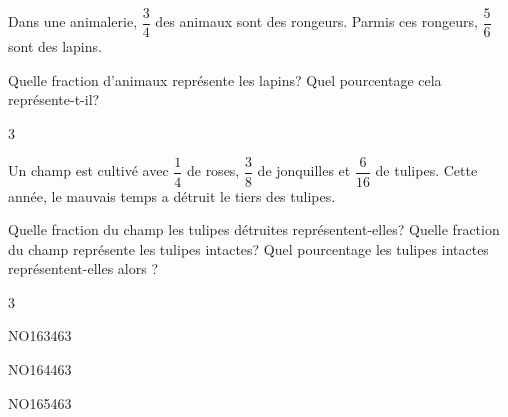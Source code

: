 \documentclass[a4paper,11pt]{report}
\begin{document}
\begin{exo}{Dans une animalerie, $\dfrac{3}{4}$ des animaux sont des rongeurs. Parmis ces rongeurs, $\dfrac{5}{6}$ sont des lapins.
\begin{tasks}
    \task Quelle fraction d'animaux représente les lapins?
    \task Quel pourcentage cela représente-t-il?
\end{tasks}
}{3}   
\end{exo}

\begin{exo}{Un champ est cultivé avec $\dfrac{1}{4}$ de roses, $\dfrac{3}{8}$ de jonquilles et $\dfrac{6}{16}$ de tulipes. Cette année, le mauvais temps a détruit le tiers des tulipes.
\begin{tasks}
    \task Quelle fraction du champ les tulipes détruites représentent-elles?
    \task Quelle fraction du champ représente les tulipes intactes? 
    \task Quel pourcentage les tulipes intactes représentent-elles alors ?
\end{tasks}
}{3}   
\end{exo}

\begin{exol}{NO163}{46}{3}
\end{exol}
\begin{exol}{NO164}{46}{3}
\end{exol}
\begin{exol}{NO165}{46}{3}
\end{exol}
\end{document}
